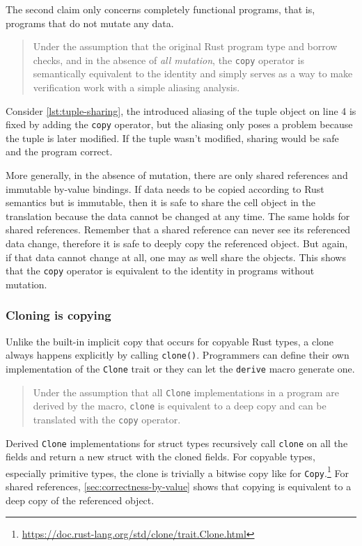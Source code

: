 The second claim only concerns completely functional programs, that is, programs
that do not mutate any data.

\begin{quote}
Under the assumption that the original Rust program type and borrow checks, and
in the absence of \emph{all mutation}, the \lstinline!copy! operator is
semantically equivalent to the identity and simply serves as a way to make
verification work with a simple aliasing analysis.
\end{quote}

Consider \autoref{lst:tuple-sharing}, the introduced aliasing of the tuple
object on line 4 is fixed by adding the \lstinline!copy! operator, but the
aliasing only poses a problem because the tuple is later modified. If the tuple
wasn't modified, sharing would be safe and the program correct.

More generally, in the absence of mutation, there are only shared references and
immutable by-value bindings. If data needs to be copied according to Rust
semantics but is immutable, then it is safe to share the cell object in the
translation because the data cannot be changed at any time. The same holds for
shared references. Remember that a shared reference can never see its referenced
data change, therefore it is safe to deeply copy the referenced object. But
again, if that data cannot change at all, one may as well share the objects.
This shows that the \lstinline!copy! operator is equivalent to the identity in
programs without mutation.

\subsubsection{Cloning is copying}
\label{sec:clone-is-copy}

Unlike the built-in implicit copy that occurs for copyable Rust types, a clone
always happens explicitly by calling \lstinline!clone()!. Programmers can define
their own implementation of the \lstinline!Clone! trait or they can let the
\lstinline!derive! macro generate one.

\begin{quote}
Under the assumption that all \lstinline!Clone! implementations in a program are
derived by the macro, \lstinline!clone! is equivalent to a deep copy and can be
translated with the \lstinline!copy! operator.
\end{quote}

Derived \lstinline!Clone! implementations for struct types recursively call
\lstinline!clone! on all the fields and return a new struct with the cloned
fields. For copyable types, especially primitive types, the clone is trivially a
bitwise copy like for
\lstinline!Copy!.\footnote{\url{https://doc.rust-lang.org/std/clone/trait.Clone.html}}
For shared references, \autoref{sec:correctness-by-value} shows that copying is
equivalent to a deep copy of the referenced object.

